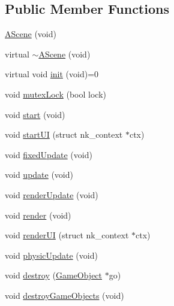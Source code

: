 \subsection*{Public Member Functions}
\begin{DoxyCompactItemize}
\item 
\mbox{\hyperlink{class_beer_engine_1_1_a_scene_a811f775c81c6d46b267e1926450a7c32}{A\+Scene}} (void)
\item 
virtual \mbox{\hyperlink{class_beer_engine_1_1_a_scene_abaa7995756d22d36008d4b541b6b20ca}{$\sim$\+A\+Scene}} (void)
\item 
virtual void \mbox{\hyperlink{class_beer_engine_1_1_a_scene_a7a55b4e506ae618e6596ae812ad48db0}{init}} (void)=0
\item 
void \mbox{\hyperlink{class_beer_engine_1_1_a_scene_a5c1cc3e869d48b92331fe606eb86497c}{mutex\+Lock}} (bool lock)
\item 
void \mbox{\hyperlink{class_beer_engine_1_1_a_scene_a332808581c9141259a6acdc2fa8e0e5c}{start}} (void)
\item 
void \mbox{\hyperlink{class_beer_engine_1_1_a_scene_a444a7a1321f9c8c14a2d3821f649c85e}{start\+UI}} (struct nk\+\_\+context $\ast$ctx)
\item 
void \mbox{\hyperlink{class_beer_engine_1_1_a_scene_a98c0b2bca184f5ba2c7a1660bead32cf}{fixed\+Update}} (void)
\item 
void \mbox{\hyperlink{class_beer_engine_1_1_a_scene_aee4c99b65b3e54bdcb62cc1096dcb397}{update}} (void)
\item 
void \mbox{\hyperlink{class_beer_engine_1_1_a_scene_accb108fe6723d99c36a85eb51a25820e}{render\+Update}} (void)
\item 
void \mbox{\hyperlink{class_beer_engine_1_1_a_scene_a445ef1917ea393ebea9be85bf0aa37f1}{render}} (void)
\item 
void \mbox{\hyperlink{class_beer_engine_1_1_a_scene_a93d3ef94fbd5201f10e9185833bc3e0c}{render\+UI}} (struct nk\+\_\+context $\ast$ctx)
\item 
void \mbox{\hyperlink{class_beer_engine_1_1_a_scene_a1b9cff7ce753a578cdd1b95308a22fec}{physic\+Update}} (void)
\item 
void \mbox{\hyperlink{class_beer_engine_1_1_a_scene_af40b9c9c30c3c55991792d45867c022b}{destroy}} (\mbox{\hyperlink{class_beer_engine_1_1_game_object}{Game\+Object}} $\ast$go)
\item 
void \mbox{\hyperlink{class_beer_engine_1_1_a_scene_a3f8b7e31b089fd39ed8c6d1505a91c16}{destroy\+Game\+Objects}} (void)
\item 

\end{DoxyCompactItemize}
